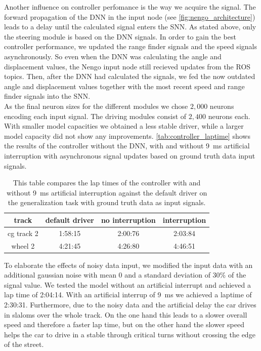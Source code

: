 \documentclass[10pt,a4paper,twoside,journal]{IEEEtran}
\begin{document}
Another influence on controller perfomance is the way we acquire the signal. The forward propagation of the DNN in the input node (see \autoref{fig:nengo_architecture}) leads to a delay until the calculated signal enters the SNN. As stated above, only the steering module is based on the DNN signals. In order to gain the best controller performance, we updated the range finder signals and the speed signals asynchronously. So even when the DNN was calculating the angle and displacement values, the Nengo input node still recieved updates from the ROS topics. Then, after the DNN had calculated the signals, we fed the now outdated angle and displacement values together with the most recent speed and range finder signals into the SNN. \\
As the final neuron sizes for the different modules we chose $2,000$ neurons encoding each input signal. The driving modules consist of $2,400$ neurons each. With smaller model capacities we obtained a less stable driver, while a larger model capacity did not show any improvements. \autoref{tab:controller_laptime} shows the results of the controller without the DNN, with and without \SI{9}{\milli\second} artificial interruption with asynchronous signal updates based on ground truth data input signals. \\
\begin{table}[ht]
	\begin{center}
		\begin{tabular}{ |c|c|c|c| } 
			\hline
			track &  default driver & no interruption & interruption \\
			\hline
			cg track 2  & 1:58:15 & 2:00:76 & 2:03:84  \\
			wheel 2 & 4:21:45 & 4:26:80 & 4:46:51 \\
			\hline
		\end{tabular}
		\caption{\label{tab:controller_laptime}This table compares the lap times of the controller with and without \SI{9}{\milli\second} artificial interruption against the default driver on the generalization task with ground truth data as input signals.}
	\end{center}
\end{table}
To elaborate the effects of noisy data input, we modified the input data with an additional gaussian noise with mean 0 and a standard deviation of 30\% of the signal value. We tested the model without an artificial interrupt and achieved a lap time of 2:04:14. With an artificial interrup of \SI{9}{\milli\second} we achieved a laptime of 2:30:31. Furthermore, due to the noisy data and the artificial delay the car drives in slaloms over the whole track. On the one hand this leads to a slower overall speed and therefore a faster lap time, but on the other hand the slower speed helps the car to drive in a stable through critical turns without crossing the edge of the street.
\end{document}
